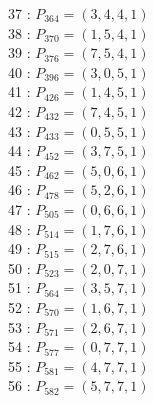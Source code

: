 \documentclass{article}
\begin{document}
{\begin{multicols}{3}
37 : $P_{364}=( 3, 4, 4, 1 )$\\
38 : $P_{370}=( 1, 5, 4, 1 )$\\
39 : $P_{376}=( 7, 5, 4, 1 )$\\
40 : $P_{396}=( 3, 0, 5, 1 )$\\
41 : $P_{426}=( 1, 4, 5, 1 )$\\
42 : $P_{432}=( 7, 4, 5, 1 )$\\
43 : $P_{433}=( 0, 5, 5, 1 )$\\
44 : $P_{452}=( 3, 7, 5, 1 )$\\
45 : $P_{462}=( 5, 0, 6, 1 )$\\
46 : $P_{478}=( 5, 2, 6, 1 )$\\
47 : $P_{505}=( 0, 6, 6, 1 )$\\
48 : $P_{514}=( 1, 7, 6, 1 )$\\
49 : $P_{515}=( 2, 7, 6, 1 )$\\
50 : $P_{523}=( 2, 0, 7, 1 )$\\
51 : $P_{564}=( 3, 5, 7, 1 )$\\
52 : $P_{570}=( 1, 6, 7, 1 )$\\
53 : $P_{571}=( 2, 6, 7, 1 )$\\
54 : $P_{577}=( 0, 7, 7, 1 )$\\
55 : $P_{581}=( 4, 7, 7, 1 )$\\
56 : $P_{582}=( 5, 7, 7, 1 )$\\
\end{multicols}


%


%


}%
\end{document}

